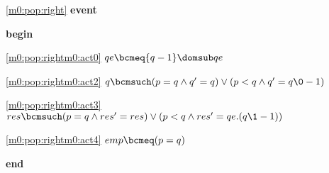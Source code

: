 \noindent \ref{m0:pop:right}  \textbf{event}
\begin{block}
  \item   \textbf{begin}
  \begin{block}
  \item[ \eqref{m0:pop:rightm0:act0} ]$qe \bcmeq \{ q-1 \} \domsub qe $ %
  \item[ \eqref{m0:pop:rightm0:act2} ]$q \bcmsuch (p = q \land q' = q) \lor (p < q \land q' = q\0-1) $ %
  \item[ \eqref{m0:pop:rightm0:act3} ]$res \bcmsuch (p = q \land res' = res) \lor (p < q \land res' = qe.(q\1-1)) $ %
  \item[ \eqref{m0:pop:rightm0:act4} ]$emp \bcmeq (p = q) $ %
  \end{block}
  \item   \textbf{end} \\
\end{block}
